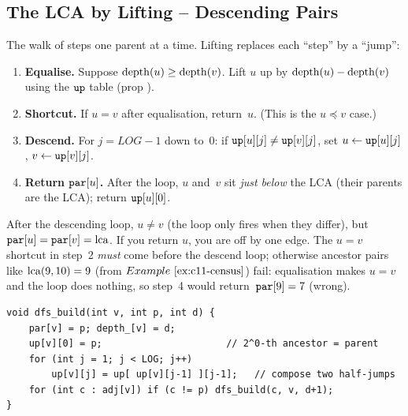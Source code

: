 \subsection{The LCA by Lifting -- Descending Pairs}

The walk of  steps one parent at a time.  Lifting
replaces each ``step'' by a ``jump'':

\begin{enumerate}[nosep]
  \item \textbf{Equalise.}  Suppose \(\operatorname{depth}(u) \ge \operatorname{depth}(v)\).  Lift
        \(u\) up by \(\operatorname{depth}(u)-\operatorname{depth}(v)\) using the \(\texttt{up}\)
        table (prop ).
  \item \textbf{Shortcut.}  If \(u = v\) after equalisation, return~\(u\).
        (This is the \(u \preceq v\) case.)
  \item \textbf{Descend.}  For \(j = \mathit{LOG}\!-\!1\) down to~0: if
        \(\texttt{up}[u][j] \ne \texttt{up}[v][j]\), set \(u \leftarrow
        \texttt{up}[u][j]\), \(v \leftarrow \texttt{up}[v][j]\).
  \item \textbf{Return \(\texttt{par}[u]\).}  After the loop, \(u\) and~\(v\)
        sit \emph{just below} the LCA (their parents are the LCA); return
        \(\texttt{up}[u][0]\).
\end{enumerate}

\begin{warningbox}
After the descending loop, \(u \ne v\) (the loop only fires when they
differ), but \(\texttt{par}[u] = \texttt{par}[v] = \operatorname{lca}\).  If you return
\(u\), you are off by one edge.  The \(u = v\) shortcut in step~2
\emph{must} come before the descend loop; otherwise ancestor pairs like
\(\operatorname{lca}(9,10)=9\) (from \(\exref{c11-census}\)) fail: equalisation makes
\(u = v\) and the loop does nothing, so step~4 would return~\(\texttt{par}[9] = 7\)
(wrong).
\end{warningbox}

\begin{lstlisting}[caption={Build the up-table (one DFS to seed, then fill by recurrence)}, label={lst:c11-build}]
void dfs_build(int v, int p, int d) {
    par[v] = p; depth_[v] = d;
    up[v][0] = p;                      // 2^0-th ancestor = parent
    for (int j = 1; j < LOG; j++)
        up[v][j] = up[ up[v][j-1] ][j-1];   // compose two half-jumps
    for (int c : adj[v]) if (c != p) dfs_build(c, v, d+1);
}
\end{lstlisting}

